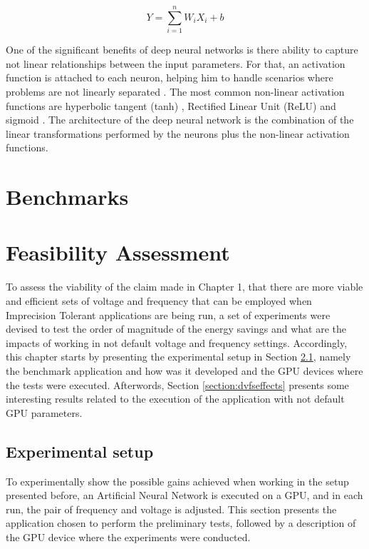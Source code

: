 \begin{equation}
\label{eq:neuron}
    Y = \sum_{i=1}^{n} W_iX_i+b
\end{equation}

One of the significant benefits of deep neural networks is there ability to capture not linear relationships between the input parameters. For that, an activation function is attached to each neuron, helping him to handle scenarios where problems are not linearly separated \cite{dong_dnnmark:_2017}. The most common non-linear activation functions are  hyperbolic tangent (tanh) \cite{orr_neural_1998}, Rectified Linear Unit (ReLU) \cite{orr_neural_1998} and sigmoid \cite{orr_neural_1998}. The architecture of the deep neural network is the combination of the linear transformations performed by the neurons plus the non-linear activation functions.

\section{Benchmarks}


\section{Feasibility Assessment}
To assess the viability of the claim made in Chapter 1, that there are more viable and efficient sets of voltage and frequency that can be employed when Imprecision Tolerant applications are being run, a set of experiments were devised to test the order of magnitude of the energy savings and what are the impacts of working in not default voltage and frequency settings. Accordingly, this chapter starts by presenting the experimental setup in Section \ref{section:experimental_setup}, namely the benchmark application and how was it developed and the GPU devices where the tests were executed. Afterwords, Section \ref{section:dvfseffects} presents some interesting results related to the execution of the application with not default GPU parameters.


\subsection{Experimental setup}
\label{section:experimental_setup}

To experimentally show the possible gains achieved when working in the setup presented before, an Artificial Neural Network is executed on a GPU, and in each run, the pair of frequency and voltage is adjusted. This section presents the application chosen to perform the preliminary tests, followed by a description of the GPU device where the experiments were conducted.

